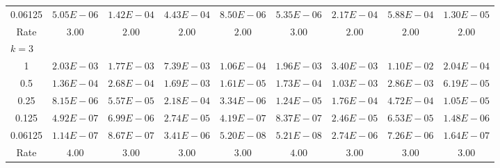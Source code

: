 \documentclass[english,11pt,3p,number,sort&compress]{elsarticle}
\begin{document}
\begin{table}[H]
{\begin{tabular}{c c c c c | c c c c}
		0.06125 & $5.05E-06$ & $1.42E-04$ & $4.43E-04$ & $8.50E-06$ & $5.35E-06$ & $2.17E-04$ & $5.88E-04$ & $1.30E-05$ \\
		Rate & $3.00$ & $2.00$ & $2.00$ & $2.00$ & $3.00$ & $2.00$ & $2.00$ & $2.00$ \\
		\midrule
		\multicolumn{9}{l}{$k = 3$} \\
		1       & $2.03E-03$ & $1.77E-03$ & $7.39E-03$ & $1.06E-04$ & $1.96E-03$ & $3.40E-03$ & $1.10E-02$ & $2.04E-04$ \\
		0.5     & $1.36E-04$ & $2.68E-04$ & $1.69E-03$ & $1.61E-05$ & $1.73E-04$ & $1.03E-03$ & $2.86E-03$ & $6.19E-05$ \\
		0.25    & $8.15E-06$ & $5.57E-05$ & $2.18E-04$ & $3.34E-06$ & $1.24E-05$ & $1.76E-04$ & $4.72E-04$ & $1.05E-05$ \\
		0.125   & $4.92E-07$ & $6.99E-06$ & $2.74E-05$ & $4.19E-07$ & $8.37E-07$ & $2.46E-05$ & $6.53E-05$ & $1.48E-06$ \\
		0.06125 & $1.14E-07$ & $8.67E-07$ & $3.41E-06$ & $5.20E-08$ & $5.21E-08$ & $2.74E-06$ & $7.26E-06$ & $1.64E-07$ \\
		Rate & $4.00$ & $3.00$ & $3.00$ & $3.00$ & $4.00$ & $3.00$ & $3.00$ & $3.00$ \\
        \bottomrule
    \end{tabular}}
	\label{tab:bishop-convergence-049}
\end{table}
\end{document}
